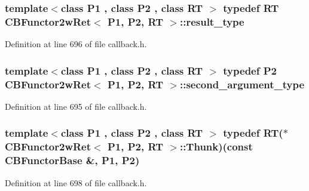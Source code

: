 \hypertarget{class_c_b_functor2w_ret_a9d2ef5e7ee4eaac99bea7abfdd21af82}{
\subsubsection[{result\+\_\+type}]{\setlength{\rightskip}{0pt plus 5cm}template$<$class P1 , class P2 , class R\+T $>$ typedef R\+T {\bf C\+B\+Functor2w\+Ret}$<$ P1, P2, R\+T $>$\+::{\bf result\+\_\+type}}}\label{class_c_b_functor2w_ret_a9d2ef5e7ee4eaac99bea7abfdd21af82}


Definition at line 696 of file callback.\+h.

\hypertarget{class_c_b_functor2w_ret_ab581d0954897537b10bf2de447b8b657}{
\subsubsection[{second\+\_\+argument\+\_\+type}]{\setlength{\rightskip}{0pt plus 5cm}template$<$class P1 , class P2 , class R\+T $>$ typedef P2 {\bf C\+B\+Functor2w\+Ret}$<$ P1, P2, R\+T $>$\+::{\bf second\+\_\+argument\+\_\+type}}}\label{class_c_b_functor2w_ret_ab581d0954897537b10bf2de447b8b657}


Definition at line 695 of file callback.\+h.

\hypertarget{class_c_b_functor2w_ret_a550afb1fd40c4dd859c80dfaa830e3aa}{
\subsubsection[{Thunk}]{\setlength{\rightskip}{0pt plus 5cm}template$<$class P1 , class P2 , class R\+T $>$ typedef R\+T($\ast$ {\bf C\+B\+Functor2w\+Ret}$<$ P1, P2, R\+T $>$\+::Thunk)(const {\bf C\+B\+Functor\+Base} \&, P1, P2)\hspace{0.3cm}{\ttfamily [protected]}}}\label{class_c_b_functor2w_ret_a550afb1fd40c4dd859c80dfaa830e3aa}


Definition at line 698 of file callback.\+h.



